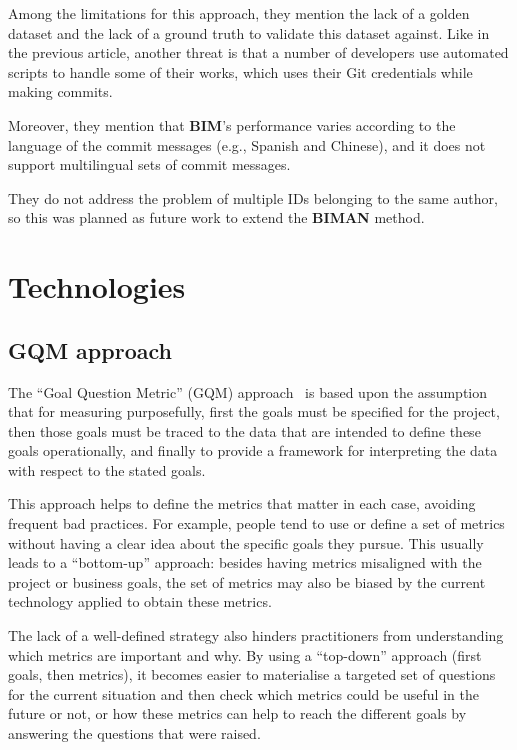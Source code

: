 \documentclass[a4paper, 12pt]{book}
\begin{document}
Among the limitations for this approach, they mention the lack of a golden dataset and the lack of a ground truth to validate this dataset against. Like in the previous article, another threat is that a number of developers use automated scripts to handle some of their works, which uses their Git credentials while making commits.

Moreover, they mention that \textbf{BIM}’s performance varies according to the language of the commit messages (e.g., Spanish and Chinese), and it does not support multilingual sets of commit messages.

They do not address the problem of multiple IDs belonging to the same author, so this was planned as future work to extend the \textbf{BIMAN} method.

\section{Technologies}
\label{sec:Technologies}

\subsection{GQM approach}
\label{ssec:gqm-approach}

The ``Goal Question Metric'' (GQM) approach~\cite{Basili94-gqm} is based upon the assumption that for measuring purposefully, first the goals must be specified for the project, then those goals must be traced to the data that are intended to define these goals operationally, and finally to provide a framework for interpreting the data with respect to the stated goals.

This approach helps to define the metrics that matter in each case, avoiding frequent bad practices. For example, people tend to use or define a set of metrics without having a clear idea about the specific goals they pursue. This usually leads to a ``bottom-up'' approach: besides having metrics misaligned with the project or business goals, the set of metrics may also be biased by the current technology applied to obtain these metrics.

The lack of a well-defined strategy also hinders practitioners from understanding which metrics are important and why. By using a ``top-down'' approach (first goals, then metrics), it becomes easier to materialise a targeted set of questions for the current situation and then check which metrics could be useful in the future or not, or how these metrics can help to reach the different goals by answering the questions that were raised.
\end{document}
